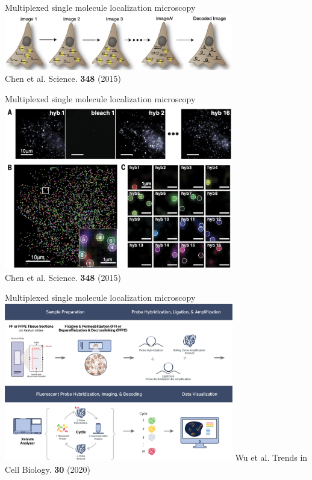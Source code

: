\documentclass{beamer}					%
\begin{document}
\begin{frame}{Multiplexed single molecule localization microscopy}
\includegraphics[width=10cm]{media/Multiplex.png}
\\Chen et al. Science. \textbf{348} (2015)
\end{frame}

\begin{frame}{Multiplexed single molecule localization microscopy}
\includegraphics[width=10cm]{media/MerFISH.png}
\\Chen et al. Science. \textbf{348} (2015)
\end{frame}

\begin{frame}{Multiplexed single molecule localization microscopy}
\includegraphics[width=10cm]{media/Xenium.png}
Wu et al. Trends in Cell Biology. \textbf{30} (2020)
\end{frame}
\end{document}
